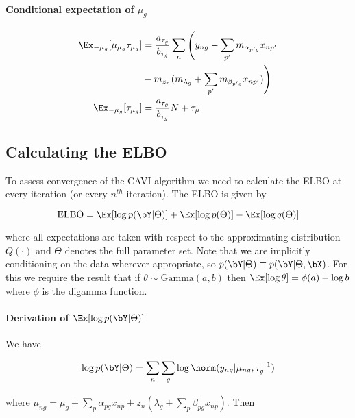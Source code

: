 \paragraph{Conditional expectation of $\mu_g$}

\begin{equation}
\begin{aligned}
\Ex_{-\mu_g}[\mu_{\mu_g} \tau_{\mu_g}] & =  \frac{a_{\tau_g}}{b_{\tau_g} }
\sum_n \Bigg(
y_{ng} - \sum_{p'} m_{\alpha_{p'g}} x_{np'} \\
& - m_{z_n}(
m_{\lambda_g} + \sum_{p'} m_{\beta_{p'g}} x_{np'})
\Bigg) \\
\Ex_{-\mu_g}[\tau_{\mu_g}] & =  \frac{a_{\tau_g}}{b_{\tau_g}} N + \tau_\mu
\end{aligned}
\end{equation}

\subsection{Calculating the ELBO}

To assess convergence of the CAVI algorithm we need to calculate the ELBO at every iteration (or every $n^{th}$ iteration). The ELBO is given by

\begin{equation}
\text{ELBO} = \Ex[\log p(\bY | \Theta)] + \Ex[\log p(\Theta)] - \Ex[\log q(\Theta)]
\end{equation}

where all expectations are taken with respect to the approximating distribution $Q(\cdot)$ and $\Theta$ denotes the full parameter set. Note that we are implicitly conditioning on the data wherever appropriate, so $p(\bY | \Theta) \equiv p(\bY | \Theta, \bX)$. For this we require the result that if $\theta \sim \text{Gamma}(a, b)$ then $\Ex[\log \theta] = \phi(a) - \log b$ where $\phi$ is the digamma function.

\paragraph{Derivation of $\Ex[\log p(\bY | \Theta)]$}

We have

\begin{equation}
\log p(\bY | \Theta) = \sum_n \sum_g \log \norm(y_{ng} | \mu_{ng}, \tau_g^{-1})
\end{equation}

where $\mu_{ng} = \mu_g + \sum_p \alpha_{pg} x_{np} + z_n \left( \lambda_g + \sum_p \beta_{pg} x_{np} \right)$. Then


